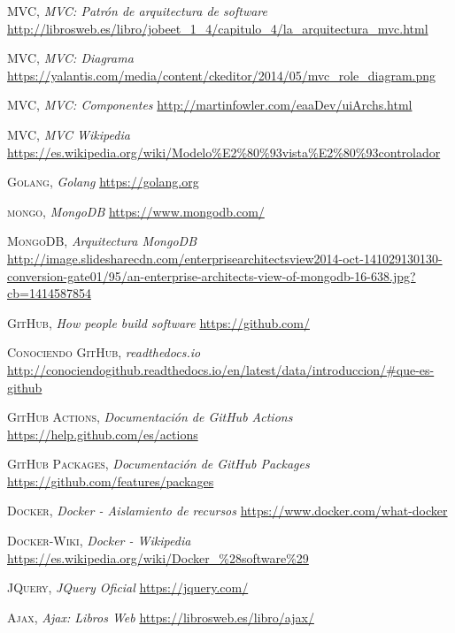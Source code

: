 \documentclass[a4paper,11pt]{book}
\begin{document}
\begin{thebibliography}{aaaa}



 \textsc{MVC},
\textit{MVC: Patrón de arquitectura de software }
\url{http://librosweb.es/libro/jobeet_1_4/capitulo_4/la_arquitectura_mvc.html}

 \textsc{MVC},
\textit{MVC: Diagrama}
\url{https://yalantis.com/media/content/ckeditor/2014/05/mvc_role_diagram.png}

 \textsc{MVC},
\textit{MVC: Componentes}
\url{http://martinfowler.com/eaaDev/uiArchs.html}

 \textsc{MVC},
\textit{MVC Wikipedia}
\url{https://es.wikipedia.org/wiki/Modelo%E2%80%93vista%E2%80%93controlador}


 \textsc{Golang},
\textit{Golang}
\url{https://golang.org}

 \textsc{mongo},
\textit{MongoDB}
\url{https://www.mongodb.com/}

 \textsc{MongoDB},
\textit{Arquitectura MongoDB}
\url{http://image.slidesharecdn.com/enterprisearchitectsview2014-oct-141029130130-conversion-gate01/95/an-enterprise-architects-view-of-mongodb-16-638.jpg?cb=1414587854}


 \textsc{GitHub},
\textit{How people build software}
\url{https://github.com/}


 \textsc{Conociendo GitHub},
\textit{readthedocs.io }
\url{http://conociendogithub.readthedocs.io/en/latest/data/introduccion/#que-es-github}

 \textsc{GitHub Actions},
\textit{Documentación de GitHub Actions }
\url{https://help.github.com/es/actions}


 \textsc{GitHub Packages},
\textit{Documentación de GitHub Packages }
\url{https://github.com/features/packages}

 \textsc{Docker},
\textit{Docker - Aislamiento de recursos}
\url{https://www.docker.com/what-docker} 

 \textsc{Docker-Wiki},
\textit{Docker - Wikipedia}
\url{https://es.wikipedia.org/wiki/Docker_\%28software\%29} 


 \textsc{JQuery},
\textit{JQuery Oficial}
\url{https://jquery.com/}


 \textsc{Ajax},
\textit{Ajax: Libros Web}
\url{https://librosweb.es/libro/ajax/}


\end{thebibliography}
\end{document}

